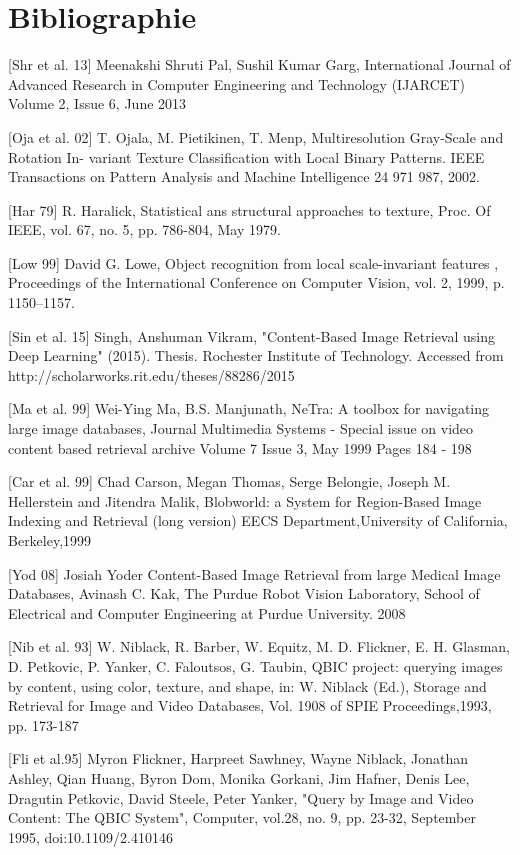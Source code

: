 
\chapter*{Bibliographie} %

[Shr et al. 13] Meenakshi Shruti Pal, Sushil Kumar Garg,  International Journal of Advanced Research in Computer Engineering and Technology (IJARCET) Volume 2, Issue 6, June 2013

[Oja et al. 02] T. Ojala, M. Pietikinen, T. Menp, Multiresolution Gray-Scale and Rotation In-
variant Texture Classification with Local Binary Patterns. IEEE Transactions on
Pattern Analysis and Machine Intelligence 24 971 987, 2002.

[Har 79] R. Haralick, Statistical ans structural approaches to texture, Proc. Of IEEE, vol.
67, no. 5, pp. 786-804, May 1979.

[Low 99] David G. Lowe, Object recognition from local scale-invariant features , Proceedings of the International Conference on Computer Vision, vol. 2,‎ 1999, p. 1150–1157.

[Sin et al. 15] Singh, Anshuman Vikram, "Content-Based Image Retrieval using Deep Learning" (2015). Thesis. Rochester Institute of Technology.  Accessed from http://scholarworks.rit.edu/theses/88286/2015

[Ma et al. 99] Wei-Ying Ma, B.S. Manjunath, NeTra: A toolbox for navigating large image databases, Journal
Multimedia Systems - Special issue on video content based retrieval archive Volume 7 Issue 3, May 1999 Pages 184 - 198 

[Car et al. 99] Chad Carson, Megan Thomas, Serge Belongie, Joseph M. Hellerstein and Jitendra Malik, Blobworld: a System for Region-Based Image Indexing and Retrieval (long version) EECS Department,University of California, Berkeley,1999


[Yod 08] Josiah Yoder Content-Based Image Retrieval from large Medical Image Databases, Avinash C. Kak, The Purdue Robot Vision Laboratory, School of Electrical and Computer Engineering at Purdue University. 2008

[Nib et al. 93] W. Niblack, R. Barber, W. Equitz, M. D. Flickner, E. H. Glasman, D. Petkovic, P. Yanker, C. Faloutsos, G. Taubin, QBIC project: querying images by content, using color, texture, and shape, in: W. Niblack (Ed.), Storage and Retrieval for Image and Video Databases, Vol. 1908 of SPIE Proceedings,1993, pp. 173-187

[Fli et al.95] Myron Flickner, Harpreet Sawhney, Wayne Niblack, Jonathan Ashley, Qian Huang, Byron Dom, Monika Gorkani, Jim Hafner, Denis Lee, Dragutin Petkovic, David Steele, Peter Yanker, "Query by Image and Video Content: The QBIC System", Computer, vol.28, no. 9, pp. 23-32, September 1995, doi:10.1109/2.410146

